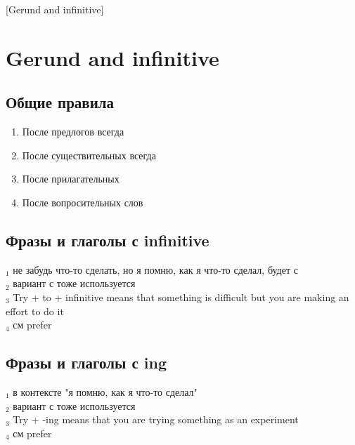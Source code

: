 [Gerund and infinitive]

\section{Gerund and infinitive}
\subsection {Общие правила}
\begin{enumerate}
    \item После предлогов всегда 
    \item После существительных всегда 
    \item После прилагательных 
    \item После вопросительных слов 
\end{enumerate}

\subsection {Фразы и глаголы с infinitive}
\p
{}
\bld{*}$_1$ не забудь что-то сделать, но я помню, как я что-то сделал, 
будет с \\
\bld{*}$_2$ вариант с  тоже используется\\
\bld{*}$_3$ Try + to + infinitive means that something is difficult but you are making an effort to do it\\
\bld{*}$_4$ см prefer

\subsection {Фразы и глаголы с ing}
\p
{}
\bld{*}$_1$ в контексте "я помню, как я что-то сделал"\\
\bld{*}$_2$ вариант с  тоже используется\\
\bld{*}$_3$ Try + -ing means that you are trying something as an experiment\\
\bld{*}$_4$ см prefer

